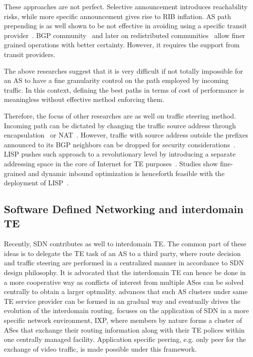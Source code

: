 These approaches are not perfect. Selective announcement introduces reachability risks, while more specific announcement gives rise to \ac{RIB} inflation. AS path prepending is as well shown to be not effective in avoiding using a specific transit provider~\cite{Quoitin2004a}. BGP community~\cite{Donnet2008, Shao2015} and later on redistributed communities~\cite{Quoitin2002} allow finer grained operations with better certainty. However, it requires the support from transit providers. 

The above researches suggest that it is very difficult if not totally impossible for an AS to have a fine granularity control on the path employed by incoming traffic. In this context, defining the best paths in terms of cost of performance is meaningless without effective method enforcing them. 

Therefore, the focus of other researches are as well on traffic steering method.
Incoming path can be dictated by changing the traffic source address through encapsulation~\cite{Liu2008} or \ac{NAT}~\cite{Sun2015}. However, traffic with source address outside the prefixes announced to its BGP neighbors can be dropped for security considerations~\cite{filtering}.
\ac{LISP} pushes such approach to a revolutionary level by introducing a separate addressing space in the core of Internet for TE purposes~\cite{lisp}. Studies show fine-grained and dynamic inbound optimization is henceforth feasible with the deployment of \ac{LISP}~\cite{Iannone2007, saucez2011mechanisms, quoitin2007evaluating}.

\subsection{Software Defined Networking and interdomain TE}
Recently, \ac{SDN} contributes as well to interdomain TE. The common part of these ideas is to delegate the TE task of an AS to a third party, where route decision and traffic steering are performed in a centralized manner in accordance to \ac{SDN} design philosophy. It is advocated that the interdomain TE can hence be done in a more cooperative way as conflicts of interest from multiple ASes can be solved centrally to obtain a larger optmality.
\citet{Kotronis2012} advances that such AS clusters under same TE service provider can be formed in an gradual way and eventually drives the evolution of the interdomain routing.
\citet{Gupta2014} focuses on the application of \ac{SDN} in a more specific network environment, \ac{IXP}, where members by nature forms a cluster of ASes that exchange their routing information along with their TE polices within one centrally managed facility. Application specific peering, e.g. only peer for the exchange of video traffic, is made possible under this framework.

